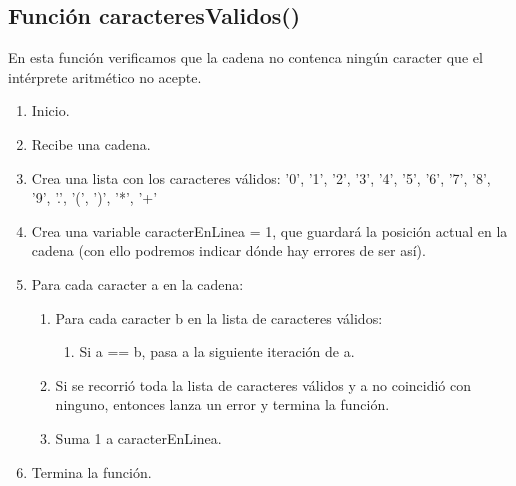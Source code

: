 \documentclass{article}
\begin{document}
\subsection{Función caracteresValidos()}
\normalsize En esta función verificamos que la cadena no contenca ningún caracter que el intérprete aritmético no acepte.
\begin{enumerate}
    \item Inicio.
    \item Recibe una cadena.
    \item Crea una lista con los caracteres válidos: '0', '1', '2', '3', '4', '5', '6', '7', '8', '9', '.', '(', ')', '*', '+'
    \item Crea una variable caracterEnLinea = 1, que guardará la posición actual en la cadena (con ello podremos indicar dónde hay errores de ser así).
    \item Para cada caracter a  en la cadena:
    \begin{enumerate}
        \item Para cada caracter b  en la lista de caracteres válidos: 
        \begin{enumerate}
            \item Si  a == b,  pasa a la siguiente iteración de a.
        \end{enumerate}
        \item Si se recorrió toda la lista de caracteres válidos y a no coincidió con ninguno, entonces lanza un error y termina la función.
        \item Suma 1 a caracterEnLinea.
    \end{enumerate}
    \item Termina la función.
\end{enumerate}
\end{document}
